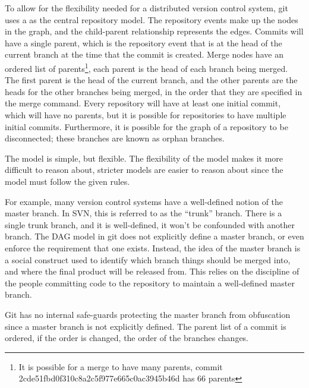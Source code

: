 To allow for the flexibility needed for a distributed version control
system, git uses a  as the central
repository model.
The repository events make up the nodes in the graph, and the
child-parent relationship represents the edges.
Commits will have a single parent, which is the repository event that
is at the head of the current branch at the time that the commit
is created.
Merge nodes have an ordered list of
parents\footnote{It is possible for a merge to have many parents, commit
  2cde51fbd0f310c8a2c5f977e665c0ac3945b46d has 66 parents},
each parent is the head of each branch being merged.
The first parent is the head of the current branch, and the other
parents are the heads for the other branches being merged, in the order
that they are specified in the merge command.
Every repository will have at least one initial commit, which
will have no parents, but it is possible for repositories to have
multiple initial commits.
Furthermore, it is possible for the graph of a repository to be
disconnected; these branches are known as orphan branches.

The model is simple, but flexible.
The flexibility of the model makes it more difficult to reason about,
stricter models are easier to reason about since the model must follow
the given rules.

For example, many version control systems have a well-defined notion of
the master branch.
In SVN, this is referred to as the ``trunk'' branch.
There is a single trunk branch, and it is well-defined, it won't be
confounded with another branch.
The DAG model in git does not explicitly define a master branch, or even
enforce the requirement that one exists.
Instead, the idea of the master branch is a social construct used to
identify which branch things should be merged into, and where the final
product will be released from.
This relies on the discipline of the people committing code to the
repository to maintain a well-defined master branch.

Git has no internal safe-guards protecting the master branch from
obfuscation since a master branch is not explicitly defined.
The parent list of a commit is ordered, if the order is changed, the
order of the branches changes.

